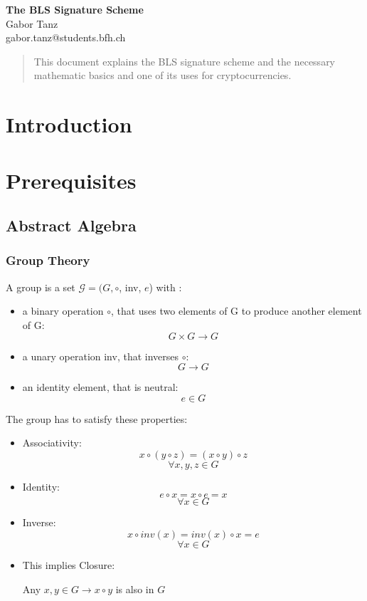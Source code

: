 \documentclass[a4paper,12pt]{scrartcl}
\begin{document}
\begin{titlepage}
\begin{center}
\vspace*{3cm}
\vspace{1cm}
\Huge \textbf{The BLS Signature Scheme} \\
\vspace{6cm}
\vspace{1cm}
\large Gabor Tanz \\ gabor.tanz@students.bfh.ch \\
\end{center}
\end{titlepage}

\tableofcontents
\pagebreak

\begin{abstract}
	This document explains the BLS signature scheme and the necessary mathematic basics and one of its uses for cryptocurrencies.
\end{abstract}
\pagebreak

\section{Introduction}
\pagebreak

\section{Prerequisites}
\subsection{Abstract Algebra}
\subsubsection{Group Theory}
A group is a set \(\mathcal{G} = (G, \circ\), inv, \(e\)) with \cite[Slide 2.16]{crypto-slides-haenni}:
\begin{itemize}
	\item a binary operation \(\circ \), that uses two elements of G to produce another element of G:
	\[ G \times G \rightarrow G \]
	\item a unary operation inv, that inverses \(\circ\):
	\[ G \rightarrow G \]
	\item an identity element, that is neutral:
	\[ e \in G \]
\end{itemize}
The group has to satisfy these properties:
\begin{itemize}
	\item Associativity:
	\[ x \circ (y \circ z) = (x \circ y) \circ z \]
	\[\forall x,y,z \in G \]
	\item Identity:
	\[ e \circ x = x \circ e = x \]
	\[ \forall x \in G \]
	\item Inverse:
	\[ x \circ inv(x) = inv(x) \circ x = e \]
	\[ \forall x \in G \]
	\item This implies Closure:
	\begin{center}
		Any \(x,y \in G \rightarrow x \circ y \) is also in \( G \)
	\end{center}
\end{itemize}
\end{document}
